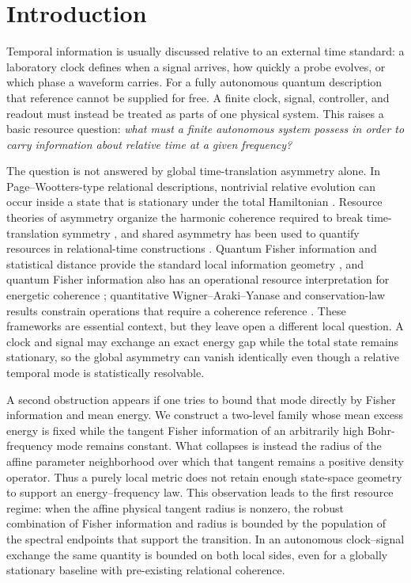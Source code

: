 \section{Introduction}
\label{sec:introduction}

Temporal information is usually discussed relative to an external time standard: a laboratory clock defines when a signal arrives, how quickly a probe evolves, or which phase a waveform carries. For a fully autonomous quantum description that reference cannot be supplied for free. A finite clock, signal, controller, and readout must instead be treated as parts of one physical system. This raises a basic resource question: \emph{what must a finite autonomous system possess in order to carry information about relative time at a given frequency?}

The question is not answered by global time-translation asymmetry alone. In Page--Wootters-type relational descriptions, nontrivial relative evolution can occur inside a state that is stationary under the total Hamiltonian \cite{PageWootters1983}. Resource theories of asymmetry organize the harmonic coherence required to break time-translation symmetry \cite{MarvianSpekkens2014Modes}, and shared asymmetry has been used to quantify resources in relational-time constructions \cite{CarmoSoaresPinto2021}. Quantum Fisher information and statistical distance provide the standard local information geometry \cite{BraunsteinCaves1994}, and quantum Fisher information also has an operational resource interpretation for energetic coherence \cite{Marvian2022,YamaguchiTajima2023}; quantitative Wigner--Araki--Yanase and conservation-law results constrain operations that require a coherence reference \cite{MarvianSpekkensWAY2012,TajimaShiraishiSaito2020}. These frameworks are essential context, but they leave open a different local question. A clock and signal may exchange an exact energy gap while the total state remains stationary, so the global asymmetry can vanish identically even though a relative temporal mode is statistically resolvable.

A second obstruction appears if one tries to bound that mode directly by Fisher information and mean energy. We construct a two-level family whose mean excess energy is fixed while the tangent Fisher information of an arbitrarily high Bohr-frequency mode remains constant. What collapses is instead the radius of the affine parameter neighborhood over which that tangent remains a positive density operator. Thus a purely local metric does not retain enough state-space geometry to support an energy--frequency law. This observation leads to the first resource regime: when the affine physical tangent radius is nonzero, the robust combination of Fisher information and radius is bounded by the population of the spectral endpoints that support the transition. In an autonomous clock--signal exchange the same quantity is bounded on both local sides, even for a globally stationary baseline with pre-existing relational coherence.

